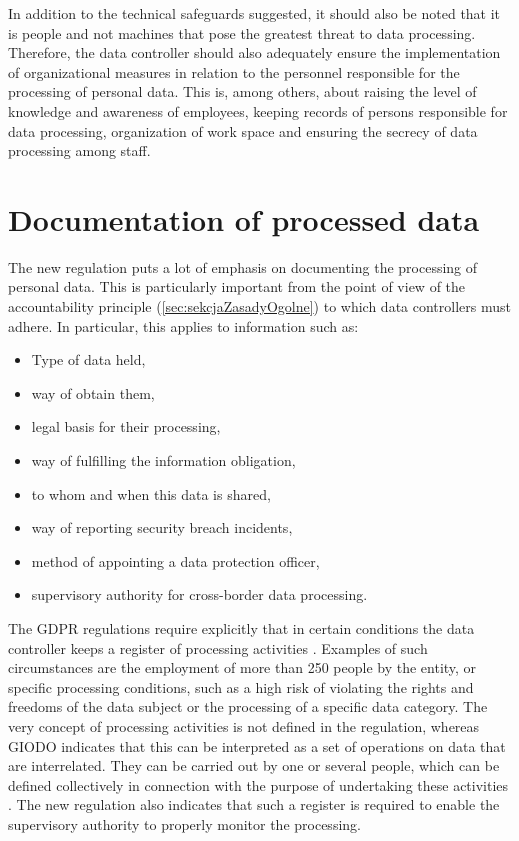 \documentclass[en, noamssymb]{mgr}
\begin{document}
In addition to the technical safeguards suggested, it should also be noted that it is people and not machines that pose the greatest threat to data processing. Therefore, the data controller should also adequately ensure the implementation of organizational measures in relation to the personnel responsible for the processing of personal data. This is, among others, about raising the level of knowledge and awareness of employees, keeping records of persons responsible for data processing, organization of work space and ensuring the secrecy of data processing among staff.

\section{Documentation of processed data}

The new regulation puts a lot of emphasis on documenting the processing of personal data. This is particularly important from the point of view of the accountability principle (\ref{sec:sekcjaZasadyOgolne}) to which data controllers must adhere. In particular, this applies to information such as:

\begin{itemize}

\item Type of data held,
\item way of obtain them,
\item legal basis for their processing,
\item way of fulfilling the information obligation,
\item to whom and when this data is shared,
\item way of reporting security breach incidents,
\item method of appointing a data protection officer,
\item supervisory authority for cross-border data processing.

\end{itemize}

The GDPR regulations require explicitly that in certain conditions the data controller keeps a register of processing activities \cite{rodo_art30}. Examples of such circumstances are the employment of more than 250 people by the entity, or specific processing conditions, such as a high risk of violating the rights and freedoms of the data subject or the processing of a specific data category. The very concept of processing activities is not defined in the regulation, whereas GIODO indicates that this can be interpreted as a set of operations on data that are interrelated. They can be carried out by one or several people, which can be defined collectively in connection with the purpose of undertaking these activities \cite{giodo_dokumentacja}. The new regulation also indicates that such a register is required to enable the supervisory authority to properly monitor the processing.
\end{document}
